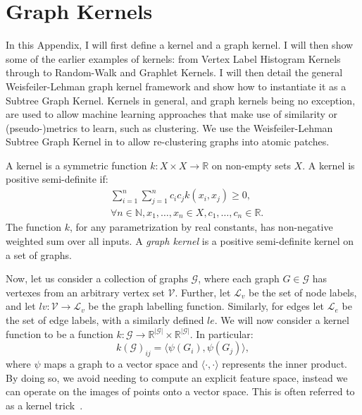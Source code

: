 \chapter{Graph Kernels}
\label{appendix:graph_kernels}

In this Appendix, I will first define a kernel and a graph kernel. I will then
show some of the earlier examples of kernels: from Vertex Label Histogram
Kernels through to Random-Walk and Graphlet Kernels. I will then detail the
general Weisfeiler-Lehman graph kernel framework and show how to instantiate it
as a Subtree Graph Kernel. Kernels in general, and graph kernels being no
exception, are used to allow machine learning approaches that make use of
similarity or (pseudo-)metrics to learn, such as clustering. We use the
Weisfeiler-Lehman Subtree Graph Kernel in  to allow
re-clustering \deltaPDGN graphs into atomic patches.

A kernel is a symmetric function $k: X \times X \rightarrow \mathbb{R}$ on
non-empty sets $X$. A kernel is positive semi-definite if:
\begin{align*}
	&\sum_{i=1}^{n} \sum_{j=1}^{n} c_i c_j k(x_i, x_j) \geq 0, \\
	&\forall n \in \mathbb{N}, x_1, \ldots, x_n \in X, c_1, \ldots, c_n \in \mathbb{R}. 
\end{align*}
The function $k$, for any
parametrization by real constants, has non-negative weighted sum over all
inputs. A \emph{graph kernel} is a positive semi-definite kernel on a set of graphs.

Now, let us consider a collection of graphs $\mathcal{G}$, where each graph $G
\in \mathcal{G}$ has vertexes from an arbitrary vertex set $\mathcal{V}$.
Further, let $\mathcal{L}_v$ be the set of node labels, and let $lv:
\mathcal{V} \rightarrow \mathcal{L}_v$ be the graph labelling function.
Similarly, for edges let $\mathcal{L}_e$ be the set of edge labels, with a
similarly defined $le$. We will now consider a kernel function to be a function
$k: \mathcal{G} \rightarrow \mathbb{R}^{|\mathcal{G}|} \times
\mathbb{R}^{|\mathcal{G}|}$. In particular:
\begin{equation}
\label{eq:kernel_general}
    k(\mathcal{G})_{ij} = \langle\psi(G_i), \psi(G_j)\rangle,
\end{equation}
%
where $\psi$ maps a graph to a vector space and $\langle\cdot,\cdot\rangle$
represents the inner product. By doing so, we avoid needing to compute an
explicit feature space, instead we can operate on the images of points onto a
vector space. This is often referred to as a kernel
trick~\cite{theodoridis2008}.

